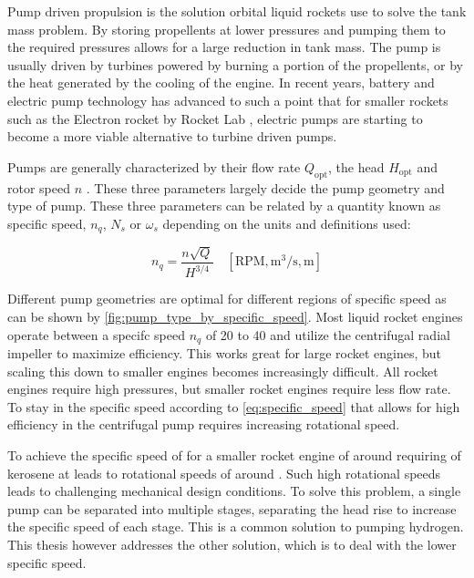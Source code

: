 Pump driven propulsion is the solution orbital liquid rockets use to solve the tank mass problem. By storing propellents at lower pressures and pumping them to the required pressures allows for a large reduction in tank mass. The pump is usually driven by turbines powered by burning a portion of the propellents, or by the heat generated by the cooling of the engine. In recent years, battery and electric pump technology has advanced to such a point that for smaller rockets such as the Electron rocket by Rocket Lab \cite{electron}, electric pumps are starting to become a more viable alternative to turbine driven pumps. 

Pumps are generally characterized by their flow rate $Q_{\textrm{opt}}$, the head $H_{\textrm{opt}}$ and rotor speed $n$ \cite{gulich}. These three parameters largely decide the pump geometry and type of pump. These three parameters can be related by a quantity known as specific speed, $n_q$, $N_s$ or $\omega_s$ depending on the units and definitions used:

\begin{equation}
    n_q = \frac{n \sqrt{Q}}{H^{3/4}} \quad [\text{RPM}, \text{m}^3/\text{s}, \text{m}] \label{eq:specific_speed}
\end{equation}

Different pump geometries are optimal for different regions of specific speed as can be shown by \cref{fig:pump_type_by_specific_speed}. Most liquid rocket engines operate between a specifc speed $n_q$ of 20 to 40 and utilize the centrifugal radial impeller to maximize efficiency. This works great for large rocket engines, but scaling this down to smaller engines becomes increasingly difficult. All rocket engines require high pressures, but smaller rocket engines require less flow rate. To stay in the specific speed according to \cref{eq:specific_speed} that allows for high efficiency in the centrifugal pump requires increasing rotational speed.

To achieve the specific speed of \valSamplepumpNq for a smaller rocket engine of around \valSamplepumpThrust requiring \valSamplepumpMdot of kerosene at \valSamplepumpP leads to rotational speeds of around \valSamplepumpN . Such high rotational speeds leads to challenging mechanical design conditions. To solve this problem, a single pump can be separated into multiple stages, separating the head rise to increase the specific speed of each stage. This is a common solution to pumping hydrogen. This thesis however addresses the other solution, which is to deal with the lower specific speed.

